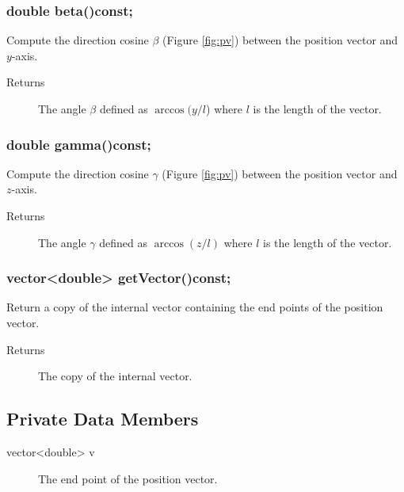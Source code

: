 \subsubsection{double beta()const;} 
Compute the direction cosine $\beta$ (Figure \ref{fig:pv}) between the position 
vector and $y$-axis.
  \begin{description}
       \item [Returns] The angle $\beta$  defined as $\arccos (y / l$)
                       where $l$ is the length of the vector. 
  \end{description} 

\subsubsection{double gamma()const;}
Compute the direction cosine $\gamma$ (Figure \ref{fig:pv}) between the position 
vector and $z$-axis.
  \begin{description}
       \item [Returns] The angle $\gamma$ defined as $\arccos (z / l)$
                       where $l$ is the length of the vector.
  \end{description} 
 
\subsubsection{vector<double> getVector()const;} 
Return a copy of the internal vector containing the end points 
of the position vector. 
  \begin{description}
       \item [Returns] The copy of the internal vector. 
  \end{description} 


\subsection{Private Data Members}
\begin{description}
 \item [vector<double> v] The end point of the position vector.

 \end{description} 

